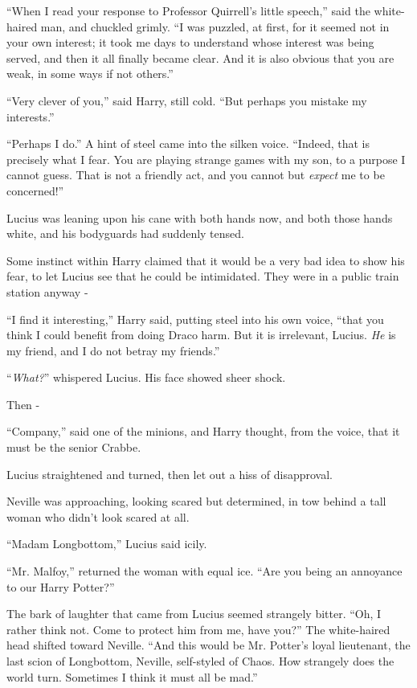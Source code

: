 ``When I read your response to Professor Quirrell's little speech,'' said the white-haired man, and chuckled grimly. ``I was puzzled, at first, for it seemed not in your own interest; it took me days to understand whose interest was being served, and then it all finally became clear. And it is also obvious that you are weak, in some ways if not others.''

``Very clever of you,'' said Harry, still cold. ``But perhaps you mistake my interests.''

``Perhaps I do.'' A hint of steel came into the silken voice. ``Indeed, that is precisely what I fear. You are playing strange games with my son, to a purpose I cannot guess. That is not a friendly act, and you cannot but \emph{expect} me to be concerned!''

Lucius was leaning upon his cane with both hands now, and both those hands white, and his bodyguards had suddenly tensed.

Some instinct within Harry claimed that it would be a very bad idea to show his fear, to let Lucius see that he could be intimidated. They were in a public train station anyway -

``I find it interesting,'' Harry said, putting steel into his own voice, ``that you think I could benefit from doing Draco harm. But it is irrelevant, Lucius. \emph{He} is my friend, and I do not betray my friends.''

``\emph{What?}'' whispered Lucius. His face showed sheer shock.

Then -

``Company,'' said one of the minions, and Harry thought, from the voice, that it must be the senior Crabbe.

Lucius straightened and turned, then let out a hiss of disapproval.

Neville was approaching, looking scared but determined, in tow behind a tall woman who didn't look scared at all.

``Madam Longbottom,'' Lucius said icily.

``Mr. Malfoy,'' returned the woman with equal ice. ``Are you being an annoyance to our Harry Potter?''

The bark of laughter that came from Lucius seemed strangely bitter. ``Oh, I rather think not. Come to protect him from me, have you?'' The white-haired head shifted toward Neville. ``And this would be Mr. Potter's loyal lieutenant, the last scion of Longbottom, Neville, self-styled of Chaos. How strangely does the world turn. Sometimes I think it must all be mad.''

